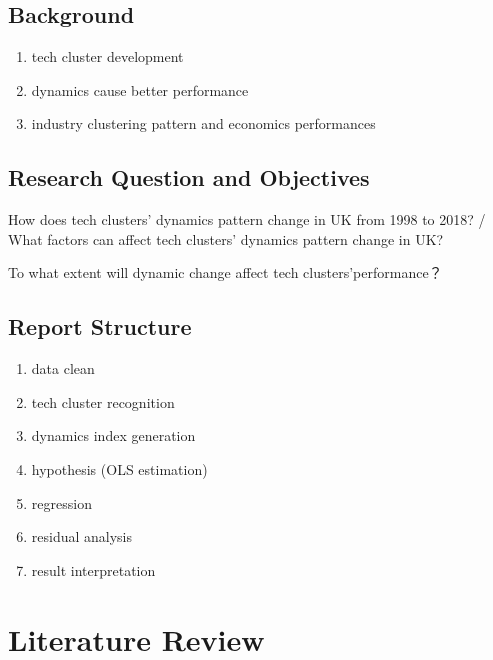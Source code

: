\documentclass[
  12pt,
  oneside]{book}
\providecommand{\tightlist}{%
  \setlength{\itemsep}{0pt}\setlength{\parskip}{0pt}}
\begin{document}

\hypertarget{background}{%
\section{Background}\label{background}}

\begin{enumerate}
\def\labelenumi{\arabic{enumi}.}
\tightlist
\item
  tech cluster development
\item
  dynamics cause better performance
\item
  industry clustering pattern and economics performances
\end{enumerate}

\hypertarget{research-question-and-objectives}{%
\section{Research Question and Objectives}\label{research-question-and-objectives}}

How does tech clusters' dynamics pattern change in UK from 1998 to 2018? / What factors can affect tech clusters' dynamics pattern change in UK?

To what extent will dynamic change affect tech clusters'performance？

\hypertarget{report-structure}{%
\section{Report Structure}\label{report-structure}}

\begin{enumerate}
\def\labelenumi{\arabic{enumi}.}
\tightlist
\item
  data clean
\item
  tech cluster recognition
\item
  dynamics index generation
\item
  hypothesis (OLS estimation)
\item
  regression
\item
  residual analysis
\item
  result interpretation
\end{enumerate}

\hypertarget{crossref}{%
\chapter{Literature Review}\label{crossref}}
\end{document}
